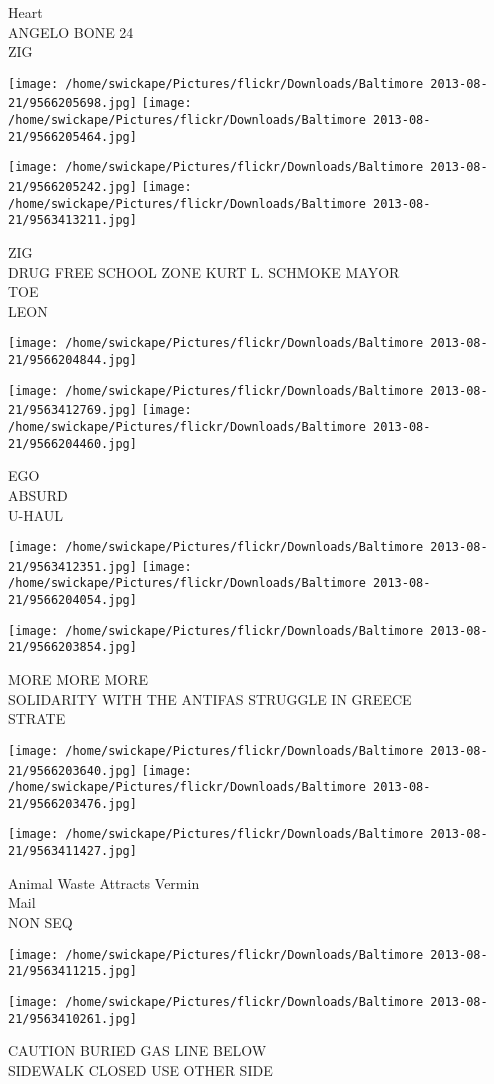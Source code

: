 \documentclass[10pt,letterpaper]{article}
\begin{document}
Heart\\
ANGELO BONE 24\\
ZIG
\pagebreak

\texttt{[image: /home/swickape/Pictures/flickr/Downloads/Baltimore 2013-08-21/9566205698.jpg]}
\texttt{[image: /home/swickape/Pictures/flickr/Downloads/Baltimore 2013-08-21/9566205464.jpg]}

\texttt{[image: /home/swickape/Pictures/flickr/Downloads/Baltimore 2013-08-21/9566205242.jpg]}
\texttt{[image: /home/swickape/Pictures/flickr/Downloads/Baltimore 2013-08-21/9563413211.jpg]}

ZIG\\
DRUG FREE SCHOOL ZONE KURT L. SCHMOKE MAYOR\\
TOE\\
LEON
\pagebreak

\texttt{[image: /home/swickape/Pictures/flickr/Downloads/Baltimore 2013-08-21/9566204844.jpg]}

\vspace{0.25in}
\texttt{[image: /home/swickape/Pictures/flickr/Downloads/Baltimore 2013-08-21/9563412769.jpg]}
\texttt{[image: /home/swickape/Pictures/flickr/Downloads/Baltimore 2013-08-21/9566204460.jpg]}

EGO\\
ABSURD\\
U{-}HAUL
\pagebreak

\texttt{[image: /home/swickape/Pictures/flickr/Downloads/Baltimore 2013-08-21/9563412351.jpg]}
\texttt{[image: /home/swickape/Pictures/flickr/Downloads/Baltimore 2013-08-21/9566204054.jpg]}

\vspace{0.25in}
\texttt{[image: /home/swickape/Pictures/flickr/Downloads/Baltimore 2013-08-21/9566203854.jpg]}

MORE MORE MORE\\
SOLIDARITY WITH THE ANTIFAS STRUGGLE IN GREECE\\
STRATE
\pagebreak

\texttt{[image: /home/swickape/Pictures/flickr/Downloads/Baltimore 2013-08-21/9566203640.jpg]}
\texttt{[image: /home/swickape/Pictures/flickr/Downloads/Baltimore 2013-08-21/9566203476.jpg]}

\texttt{[image: /home/swickape/Pictures/flickr/Downloads/Baltimore 2013-08-21/9563411427.jpg]}

Animal Waste Attracts Vermin\\
Mail\\
NON SEQ
\pagebreak

\texttt{[image: /home/swickape/Pictures/flickr/Downloads/Baltimore 2013-08-21/9563411215.jpg]}

\vspace{0.25in}
\texttt{[image: /home/swickape/Pictures/flickr/Downloads/Baltimore 2013-08-21/9563410261.jpg]}

CAUTION BURIED GAS LINE BELOW\\
SIDEWALK CLOSED USE OTHER SIDE
\pagebreak
\end{document}
